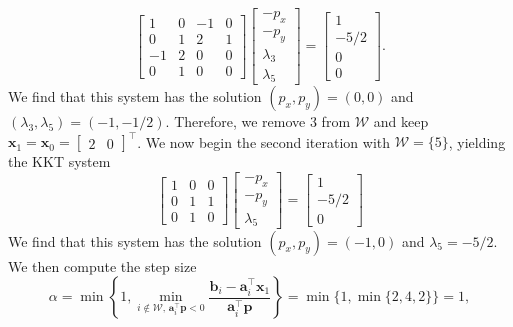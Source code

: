 \documentclass{../kin_math}
\begin{document}
\begin{questions}
\begin{enumerate}
\begin{solution}
      \begin{equation*}
        \begin{bmatrix} 1 & 0 & -1 & 0 \\ 0 & 1 & 2 & 1 \\ -1 & 2 & 0 & 0 \\ 0 & 1 & 0 & 0 \end{bmatrix} \begin{bmatrix} -p_x \\ -p_y \\ \lambda_3 \\ \lambda_5 \end{bmatrix} = \begin{bmatrix} 1 \\ -5 / 2 \\ 0 \\ 0 \end{bmatrix}.
      \end{equation*}
      We find that this system has the solution $(p_x, p_y) = (0, 0)$ and $(\lambda_3, \lambda_5) = (-1, -1 / 2)$. Therefore, we remove $3$ from $\mathcal{W}$ and keep $\textbf{x}_1 = \textbf{x}_0 = \begin{bmatrix} 2 & 0 \end{bmatrix}^\top$. We now begin the second iteration with $\mathcal{W} = \{5\}$, yielding the KKT system
      \begin{equation*}
        \begin{bmatrix} 1 & 0 & 0 \\ 0 & 1 & 1 \\ 0 & 1 & 0 \end{bmatrix} \begin{bmatrix} -p_x \\ -p_y \\ \lambda_5 \end{bmatrix} = \begin{bmatrix} 1 \\ -5 / 2 \\ 0 \end{bmatrix}
      \end{equation*}
      We find that this system has the solution $(p_x, p_y) = (-1, 0)$ and $\lambda_5 = -5 / 2$. We then compute the step size
      \begin{equation*}
        \alpha = \min\left\{1, \min_{i \notin \mathcal{W}, \, \textbf{a}_i^\top \textbf{p} < 0} \frac{\textbf{b}_i - \textbf{a}_i^\top \textbf{x}_1}{\textbf{a}_i^\top \textbf{p}} \right\} = \min\{1, \min\{2, 4, 2\}\} = 1,
      \end{equation*}

\end{solution}
\end{enumerate}
\end{questions}
\end{document}
